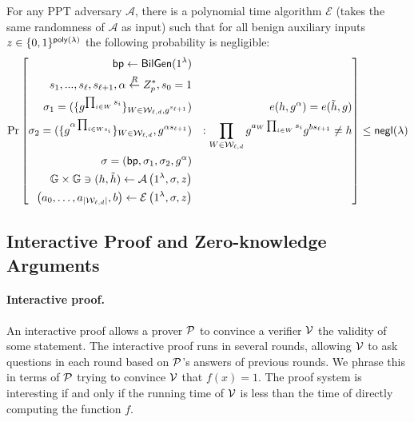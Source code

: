 \begin{assumption}
	\label{asp::dlEPKE}
	For any PPT adversary $\mathcal{A}$, there is a polynomial time algorithm $\mathcal{E}$ (takes the same randomness of $\mathcal{A}$ as input) such that for all benign auxiliary inputs $z \in \{0,1\}^{\poly({\lambda})}$ the following probability is negligible:
	\[\Pr\left[ \begin{aligned}
	\mathsf{bp} \leftarrow \mathsf{BilGen}(1^\lambda) && \\
	s_1, ..., s_\ell, s_{\ell + 1}, \alpha \overset{R}{\leftarrow} Z_{p}^*, s_0=1 && \\
	\sigma_1 = (\{g^{\prod_{i\in W}s_i}\}_{W\in \mathcal{W}_{\ell, d}, g^{s_{\ell+1}}}) &&\hspace*{10pt} e(h, g^\alpha)=e(\tilde{h}, g)\\
	\sigma_2 = (\{g^{\alpha\prod_{i\in Ws_i}}\}_{W\in \mathcal{W}_{\ell, d}}, g^{\alpha s_{\ell+1}}) && : \prod_{W\in \mathcal{W}_{\ell, d}}g^{a_{W}\prod_{i\in W}s_i}g^{b{s_{\ell+1}}}\neq h\\
	\sigma = (\mathsf{bp}, \sigma_1, \sigma_2, g^{\alpha}) && \\
	\mathbb{G} \times \mathbb{G} \ni (h, \tilde{h}) \leftarrow \mathcal{A} \left(1^{\lambda}, \sigma, z\right)&& \\
	\left( a _ { 0 } , \dots , a _ { \left| \mathcal { W } _ { \ell , d } \right| } , b \right) \leftarrow \mathcal { E } \left( 1 ^ { \lambda } , \sigma , z \right) &&
	\end{aligned}\right] \le \negl{(\lambda)}\]
\end{assumption}

\subsection{Interactive Proof and Zero-knowledge Arguments}

\paragraph{Interactive proof.} An interactive proof allows a prover $\P$ to convince a verifier $\V$ the validity of some statement. The interactive proof runs in several rounds, allowing $\V$ to ask questions in each round based on $\P$'s answers of previous rounds. We phrase this in terms of $\P$ trying to convince $\V$ that $f(x)=1$. The proof system is interesting if and only if the running time of $\V$ is less than the time of directly computing the function $f$.

